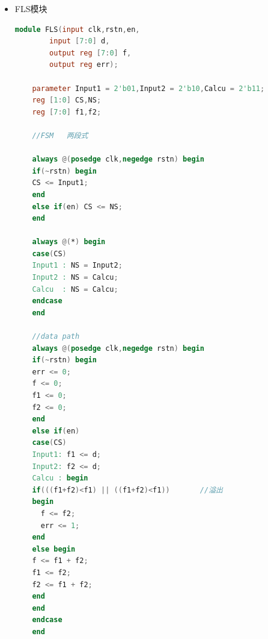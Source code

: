 \documentclass[UTF8,fontset=fandol]{ctexart}
\begin{document}
\begin{itemize}
\begin{itemize}
\begin{lstlisting}[language=Verilog,keywordstyle=\color{red!70}]
        always @(CS,x) begin
        case(CS)
        S0: begin
          if(x == 0) NS = S1;
          else  NS = T1;
          y = ry[0];
        end
        S1: begin
          if(x == 0) NS = S2;
          else  NS = T1;
          y = ry[0];
          end
        S2: begin
          if(x == 0) NS = S3;
          else  NS = T1;
          y = ry[0];
        end
        S3: begin
          if(x == 0) NS = S4;
          else  NS = T1;
          y = ry[0];
        end
        S4: begin
          if(x == 0) NS= S5;
          else  NS = T1;
          y = ry[0];
        end
        S5: begin
          if(x == 0) begin
            NS = S5;
            y = 0;
          end 
          else NS = T1;
         end
        T1: begin
          if(x == 0) NS = S1;
          else NS = T2;
          y = ry[0];
        end
        T2: begin
          if(x == 0) NS = S1;
          else  NS = T3;
          y = ry[0];
        end
        T3: begin
          if(x == 0) NS = S1;
          else  NS = T4;
          y = ry[0];
        end
        T4: begin
          if(x == 0) NS = S1;
          else  NS = T5;
          y = ry[0];
        end
        
        T5: begin
          if(x == 0)
            NS = S1;
          else begin
            NS = T5;
            y = 1;
          end 
        end
        endcase
        end 
        endmodule
        \end{lstlisting}

        \item FLS模块
    \begin{lstlisting}[language=Verilog,keywordstyle=\color{red!70}]
        module FLS(input clk,rstn,en,      
        input [7:0] d,
        output reg [7:0] f,
        output reg err);       
    
    parameter Input1 = 2'b01,Input2 = 2'b10,Calcu = 2'b11; 
    reg [1:0] CS,NS;
    reg [7:0] f1,f2;
    
    //FSM   两段式
    
    always @(posedge clk,negedge rstn) begin
    if(~rstn) begin
    CS <= Input1;
    end
    else if(en) CS <= NS; 
    end
    
    always @(*) begin
    case(CS) 
    Input1 : NS = Input2;
    Input2 : NS = Calcu;
    Calcu  : NS = Calcu;
    endcase  
    end
    
    //data path
    always @(posedge clk,negedge rstn) begin
    if(~rstn) begin
    err <= 0;
    f <= 0;
    f1 <= 0;
    f2 <= 0;
    end 
    else if(en)
    case(CS) 
    Input1: f1 <= d;
    Input2: f2 <= d;
    Calcu : begin
    if(((f1+f2)<f1) || ((f1+f2)<f1))       //溢出
    begin
      f <= f2;
      err <= 1;
    end     
    else begin
    f <= f1 + f2;
    f1 <= f2;
    f2 <= f1 + f2;
    end
    end
    endcase
    end
    

\end{lstlisting}
\end{itemize}
\end{itemize}
\end{document}
